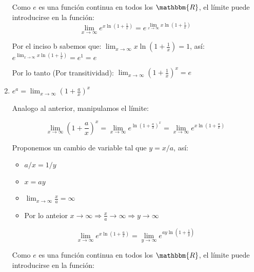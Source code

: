 \documentclass[12pt]{article}
\begin{document}
\begin{enumerate}[\hspace{9px} a)]
        Como $e$ es una funci\'on continua en todos los $\mathbbm{R}$, el l\'imite puede introducirse en la funci\'on:  
        \begin{equation*}
            \lim_{x \to \infty}e^{\displaystyle x\ln\left(1+\frac{1}{x}\right)} = e^{\displaystyle\lim_{x \to \infty}x\ln\left(1+\frac{1}{x}\right)}
        \end{equation*}

        Por el inciso b sabemos que: \(\displaystyle\lim_{x \to \infty}x\ln\left(1+\frac{1}{x}\right)=1\), as\'i: \quad \(\displaystyle e^{\displaystyle\lim_{x \to \infty}x\ln\left(1+\frac{1}{x}\right)} = e^1 = e\)\bigskip

        Por lo tanto (Por transitividad): \qquad
        \(\displaystyle\lim_{x \to \infty}\left(1+\frac{1}{x}\right)^x=e\)\bigskip

    \item \(e^a=\displaystyle\lim_{x \to \infty}\left(1+\frac{a}{x}\right)^x\)\bigskip
    
        Analogo al anterior, manipulamos el l\'imite:

        \begin{equation*}
            \lim_{x \to \infty}\left(1+\frac{a}{x}\right)^x = \lim_{x \to \infty}e^{\displaystyle\ln\left(1+\frac{a}{x}\right)^x} = \lim_{x \to \infty}e^{\displaystyle x\ln\left(1+\frac{a}{x}\right)}
        \end{equation*}

        Proponemos un cambio de variable tal que \(y=x/a\), as\'i:

        \begin{itemize}
            \item \(a/x = 1/y\)
            \item \(x=ay\)
            \item \(\lim_{x \to \infty}\frac{x}{a}=\infty\)
            \item Por lo anteior \(x\to\infty \Rightarrow \frac{x}{a}\to\infty \Rightarrow y\to\infty\)
        \end{itemize}

        \begin{equation*}
            \lim_{x \to \infty}e^{\displaystyle x\ln\left(1+\frac{a}{x}\right)} = \lim_{y \to \infty}e^{\displaystyle ay\ln\left(1+\frac{1}{y}\right)}
        \end{equation*}

        Como $e$ es una funci\'on continua en todos los $\mathbbm{R}$, el l\'imite puede introducirse en la funci\'on:


\end{enumerate}
\end{document}
